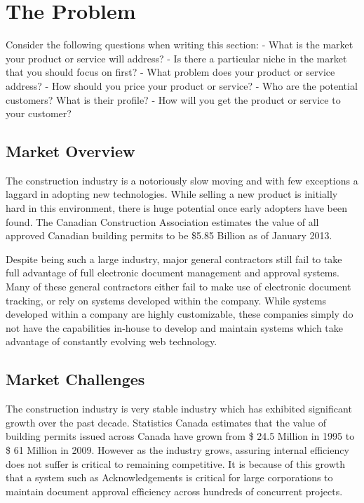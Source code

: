 \section{The Problem}
Consider the following questions when writing this section:
- What is the market your product or service will address?
- Is there a particular niche in the market that you should focus on first?
- What problem does your product or service address?
- How should you price your product or service?
- Who are the potential customers? What is their profile?
- How will you get the product or service to your customer?


\subsection{Market Overview}
The construction industry is a notoriously slow moving and with few exceptions a laggard in adopting new technologies. While selling a new product is initially hard in this environment, there is huge potential once early adopters have been found. The Canadian Construction Association estimates the value of all approved Canadian building permits to be \$5.85 Billion as of January 2013.

Despite being such a large industry, major general contractors still fail to take full advantage of full electronic document management and approval systems. Many of these general contractors either fail to make use of electronic document tracking, or rely on systems developed within the company. While systems developed within a company are highly customizable, these companies simply do not have the capabilities in-house to develop and maintain systems which take advantage of constantly evolving web technology.

\subsection{Market Challenges}

The construction industry is very stable industry which has exhibited significant growth over the past decade. Statistics Canada estimates that the value of building permits issued across Canada have grown from \$ 24.5 Million in 1995 to \$ 61 Million in 2009. However as the industry grows, assuring internal efficiency does not suffer is critical to remaining competitive. It is because of this growth that a system such as Acknowledgements is critical for large corporations to maintain document approval efficiency across hundreds of concurrent projects.

